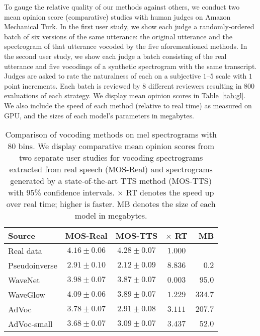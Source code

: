 \documentclass[a4paper]{article}
\begin{document}
To gauge the relative quality of our methods against others,
we conduct two mean opinion score (comparative) studies with human judges on Amazon Mechanical Turk. 
In the first user study, 
we show each judge a randomly-ordered batch of six versions of the same utterance: the original utterance and the spectrogram of that utterance vocoded by the five aforementioned methods. 
In the second user study, 
we show each judge a batch consisting of the real utterance and five vocodings of a synthetic spectrogram with the same transcript.
Judges are asked to rate the naturalness of each on a subjective $1$--$5$ scale with $1$ point increments. 
Each batch is reviewed by $8$ different reviewers resulting in $800$ evaluations of each strategy.
We display 
mean opinion scores
in Table~\ref{tab:gl}. 
We also include the speed of each method (relative to real time) as measured on GPU, and the sizes of each model's parameters in megabytes. 


\begin{table}[t]
\centering
\caption{Comparison of vocoding methods on mel spectrograms with $80$ bins. We display comparative mean opinion scores from two separate user studies for vocoding spectrograms extracted from real speech (MOS-Real) and spectrograms generated by a state-of-the-art TTS method (MOS-TTS) with $95$\% confidence intervals. $\mathbf{\times}$ RT denotes the speed up over real time; higher is faster. MB denotes the size of each model in megabytes.
}
\footnotesize
\begin{tabular}{lcccr}
\toprule
Source & MOS-Real & MOS-TTS & $\times$ RT & MB \\
\midrule
Real data & $4.16 \pm 0.06$& $4.28 \pm 0.07$  & $1.000$ &   \\
Pseudoinverse & $2.91 \pm 0.10$ & $2.12 \pm 0.09$ & $8.836$ & $0.2$ \\
WaveNet \cite{oord2016wavenet} & $3.98 \pm 0.07$ & $3.87 \pm 0.07$ & $0.003$ & $95.0$ \\
WaveGlow \cite{waveglow} & $4.09 \pm 0.06$ & $3.89 \pm 0.07$ & $1.229$ & $334.7$ \\
AdVoc & $3.78 \pm 0.07$ & $2.91 \pm 0.08$ & $3.111$ & $207.7$ \\
AdVoc-small & $3.68 \pm 0.07$ & $3.09 \pm 0.07$ & $3.437$ & $52.0$ \\
\bottomrule
\end{tabular}
\label{tab:realMOS}

\end{table}
\end{document}
